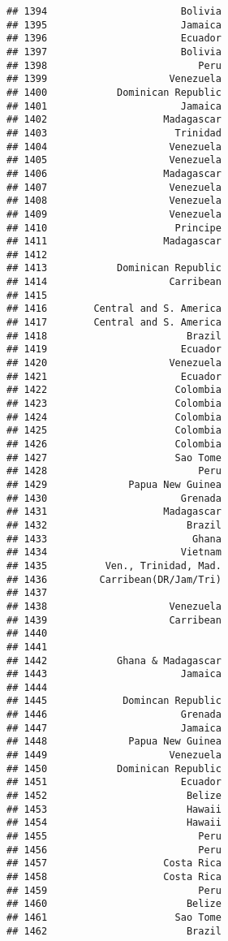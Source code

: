 \documentclass[
]{article}
\begin{document}
\begin{verbatim}
## 1394                       Bolivia
## 1395                       Jamaica
## 1396                       Ecuador
## 1397                       Bolivia
## 1398                          Peru
## 1399                     Venezuela
## 1400            Dominican Republic
## 1401                       Jamaica
## 1402                    Madagascar
## 1403                      Trinidad
## 1404                     Venezuela
## 1405                     Venezuela
## 1406                    Madagascar
## 1407                     Venezuela
## 1408                     Venezuela
## 1409                     Venezuela
## 1410                      Principe
## 1411                    Madagascar
## 1412                              
## 1413            Dominican Republic
## 1414                     Carribean
## 1415                              
## 1416        Central and S. America
## 1417        Central and S. America
## 1418                        Brazil
## 1419                       Ecuador
## 1420                     Venezuela
## 1421                       Ecuador
## 1422                      Colombia
## 1423                      Colombia
## 1424                      Colombia
## 1425                      Colombia
## 1426                      Colombia
## 1427                      Sao Tome
## 1428                          Peru
## 1429              Papua New Guinea
## 1430                       Grenada
## 1431                    Madagascar
## 1432                        Brazil
## 1433                         Ghana
## 1434                       Vietnam
## 1435          Ven., Trinidad, Mad.
## 1436         Carribean(DR/Jam/Tri)
## 1437                              
## 1438                     Venezuela
## 1439                     Carribean
## 1440                              
## 1441                              
## 1442            Ghana & Madagascar
## 1443                       Jamaica
## 1444                              
## 1445             Domincan Republic
## 1446                       Grenada
## 1447                       Jamaica
## 1448              Papua New Guinea
## 1449                     Venezuela
## 1450            Dominican Republic
## 1451                       Ecuador
## 1452                        Belize
## 1453                        Hawaii
## 1454                        Hawaii
## 1455                          Peru
## 1456                          Peru
## 1457                    Costa Rica
## 1458                    Costa Rica
## 1459                          Peru
## 1460                        Belize
## 1461                      Sao Tome
## 1462                        Brazil

\end{verbatim}
\end{document}
